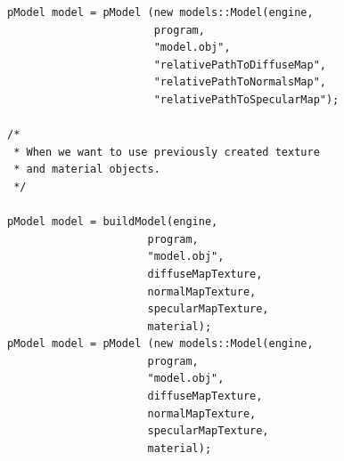 \documentclass{article}
\begin{document}
\begin{lstlisting}
pModel model = pModel (new models::Model(engine,
                       program,
                       "model.obj",
                       "relativePathToDiffuseMap",
                       "relativePathToNormalsMap",
                       "relativePathToSpecularMap");
                       
/*
 * When we want to use previously created texture
 * and material objects.
 */

pModel model = buildModel(engine,
                      program,
                      "model.obj",
                      diffuseMapTexture,
                      normalMapTexture,
                      specularMapTexture,
                      material);
pModel model = pModel (new models::Model(engine,
                      program,
                      "model.obj",
                      diffuseMapTexture,
                      normalMapTexture,
                      specularMapTexture,
                      material);
\end{lstlisting}
\end{document}
